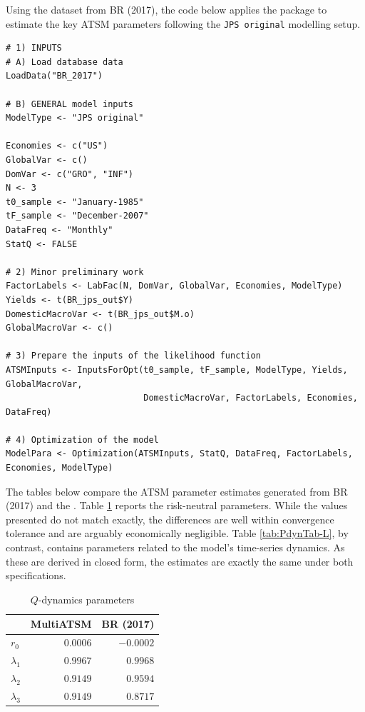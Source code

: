 Using the dataset from BR (2017), the code below applies the  package to estimate the key ATSM parameters following the \texttt{JPS\ original} modelling setup.

\begin{verbatim}
# 1) INPUTS
# A) Load database data
LoadData("BR_2017")

# B) GENERAL model inputs
ModelType <- "JPS original"

Economies <- c("US")
GlobalVar <- c()
DomVar <- c("GRO", "INF")
N <- 3
t0_sample <- "January-1985"
tF_sample <- "December-2007"
DataFreq <- "Monthly"
StatQ <- FALSE

# 2) Minor preliminary work
FactorLabels <- LabFac(N, DomVar, GlobalVar, Economies, ModelType)
Yields <- t(BR_jps_out$Y)
DomesticMacroVar <- t(BR_jps_out$M.o)
GlobalMacroVar <- c()

# 3) Prepare the inputs of the likelihood function
ATSMInputs <- InputsForOpt(t0_sample, tF_sample, ModelType, Yields, GlobalMacroVar,
                           DomesticMacroVar, FactorLabels, Economies, DataFreq)

# 4) Optimization of the model
ModelPara <- Optimization(ATSMInputs, StatQ, DataFreq, FactorLabels, Economies, ModelType)
\end{verbatim}

The tables below compare the ATSM parameter estimates generated from BR (2017) and the . Table \ref{tab:QdynTab-L} reports the risk-neutral parameters. While the values presented do not match exactly, the differences are well within convergence tolerance and are arguably economically negligible. Table \ref{tab:PdynTab-L}, by contrast, contains parameters related to the model's time-series dynamics. As these are derived in closed form, the estimates are exactly the same under both specifications.

\newpage

\begin{table}[!h]
\centering
\caption{\label{tab:QdynTab-L}$Q$-dynamics parameters}
\centering
\fontsize{7}{9}\selectfont
\begin{tabular}[t]{lrr}
\toprule
  & MultiATSM & BR (2017)\\
\midrule
$r_0$ & $0.0006$ & $-0.0002$\\
$\lambda_1$ & $0.9967$ & $0.9968$\\
$\lambda_2$ & $0.9149$ & $0.9594$\\
$\lambda_3$ & $0.9149$ & $0.8717$\\
\bottomrule
\end{tabular}
\end{table}

